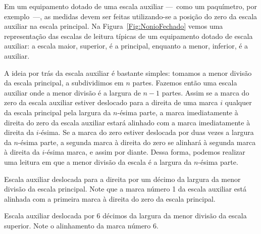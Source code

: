 Em um equipamento dotado de uma escala auxiliar ---~como um paquímetro, por exemplo~---, as medidas devem ser feitas utilizando-se a posição do zero da escala auxiliar na escala principal. Na Figura~\eqref{Fig:NonioFechado} vemos uma representação das escalas de leitura típicas de um equipamento dotado de escala auxiliar: a escala maior, superior, é a principal, enquanto a menor, inferior, é a auxiliar.

A ideia por trás da escala auxiliar é bastante simples: tomamos a menor divisão da escala principal, a subdividimos em $n$ partes. Fazemos então uma escala auxiliar onde a menor divisão é a largura de $n-1$ partes. Assim se a marca do zero da escala auxiliar estiver deslocado para a direita de uma marca $i$ qualquer da escala principal pela largura da $n$-ésima parte, a marca imediatamente à direita do zero da escala auxiliar estará alinhado com a marca imediatamente à direita da $i$-ésima. Se a marca do zero estiver deslocada por duas vezes a largura da $n$-ésima parte, a segunda marca à direita do zero se alinhará à segunda marca à direita da $i$-ésima marca, e assim por diante. Dessa forma, podemos realizar uma leitura em que a menor divisão da escala é a largura da $n$-ésima parte.

\begin{marginfigure}
\centering
{}
\caption{Escala auxiliar deslocada para a direita por um décimo da largura da menor divisão da escala principal. Note que a marca número 1 da escala auxiliar está alinhada com a primeira marca à direita do zero da escala principal. \label{Fig:NonioAbertoUmaParte}}
\end{marginfigure}

\begin{marginfigure}
\centering
{}
\caption{Escala auxiliar deslocada por 6 décimos da largura da menor divisão da escala superior. Note o alinhamento da marca número 6.\label{Fig:NonioAbertoSeisPartes}}
\end{marginfigure}

